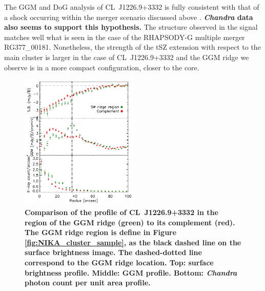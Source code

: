 \documentclass[twocolumn,traditabstract]{aa}
\begin{document}
The GGM and DoG analysis of \mbox{CL~J1226.9+3332} is fully consistent with that of a shock occurring within the merger scenario discussed above \citep[see also][for more details]{Adam2015}. {\bf \textit{Chandra} data also seems to support this hypothesis.} The structure observed in the signal matches well what is seen in the case of the RHAPSODY-G multiple merger RG377\_00181. Nonetheless, the strength of the tSZ extension with respect to the main cluster is larger in the case of \mbox{CL~J1226.9+3332} and the GGM ridge we observe is in a more compact configuration, closer to the core.

\begin{figure}[h]
\center
\includegraphics[trim=0cm 0cm 0cm 0cm, clip=true, width=0.5\textwidth]{Figure/profile_CLJ1227.pdf} 
\caption{\footnotesize{\bf Comparison of the profile of \mbox{CL~J1226.9+3332} in the region of the GGM ridge (green) to its complement (red). The GGM ridge region is define in Figure \ref{fig:NIKA_cluster_sample}, as the black dashed line on the surface brightness image. The dashed-dotted line correspond to the GGM ridge location. {\bf Top:} surface brightness profile. {\bf Middle:} GGM profile. {\bf Bottom:} \textit{Chandra} photon count per unit area profile.}}
\label{fig:profile_CLJ1227}
\end{figure}

\end{document}
